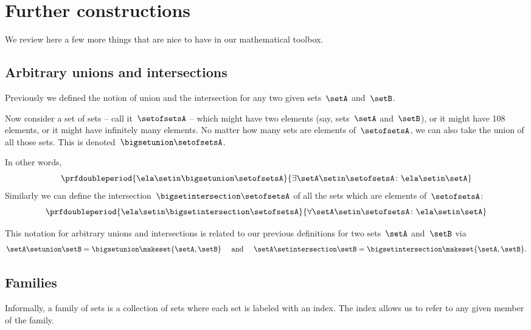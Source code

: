 
\section{Further constructions}
\label{sec:more-constructions}

We review here a few more things that are nice to have in our mathematical toolbox.

\subsection{Arbitrary unions and intersections}

Previously we defined the notion of union and the intersection for any two given sets~$\setA$ and~$\setB$.

Now consider a set of sets -- call it~$\setofsetsA$ -- which might have two elements (say, sets~$\setA$ and~$\setB$), or it might have 108 elements, or it might have infinitely many elements.
No matter how many sets are elements of~$\setofsetsA$, we can also take the union of all those sets.
This is denoted~$\bigsetunion \setofsetsA$.

In other words,
%
\begin{equation}
    \prfdoubleperiod{ \ela \setin\bigsetunion \setofsetsA }{\exists \setA \setin\setofsetsA \colon \ela \setin\setA}
\end{equation}
%
Similarly we can define the intersection~$\bigsetintersection \setofsetsA$ of all the sets which are elements of~$\setofsetsA$:
%
\begin{equation}
    \prfdoubleperiod{\ela \setin\bigsetintersection \setofsetsA}{\forall \setA \setin\setofsetsA \colon \ela \setin\setA}
\end{equation}

This notation for arbitrary unions and intersections is related to our previous definitions for two sets~$\setA$ and~$\setB$ via
\begin{equation}
    \setA \setunion \setB = \bigsetunion \makeset{ \setA, \setB }  \quad \text{ and } \quad \setA \setintersection \setB = \bigsetintersection \makeset{ \setA, \setB }.
\end{equation}

\subsection{Families}

Informally, a family of sets is a collection of sets where each set is labeled with an index.
The index allows us to refer to any given member of the family.

